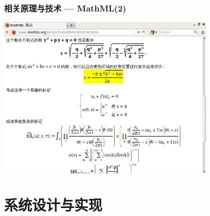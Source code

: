     \begin{frame}
        \frametitle{相关原理与技术 --- MathML(2)}
        \begin{center}
            \includegraphics[width=0.8\textwidth]{pic/mathml2.png}
        \end{center}
    \end{frame}
    
    \section{系统设计与实现}
    

